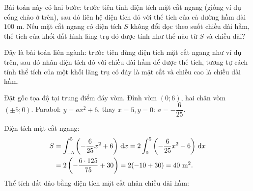 \begin{center}
\end{center}

\begin{hopgoiy}
Bài toán này có hai bước: trước tiên tính diện tích mặt cắt ngang (giống ví dụ cổng chào ở trên), sau đó liên hệ diện tích đó với thể tích của cả đường hầm dài $100$ m. Nếu mặt cắt ngang có diện tích $S$ không đổi dọc theo suốt chiều dài hầm, thể tích của khối đất hình lăng trụ đó được tính như thế nào từ $S$ và chiều dài?
\end{hopgoiy}

\begin{hopyduong}
Đây là bài toán liên ngành: trước tiên dùng diện tích mặt cắt ngang như ví dụ trên, sau đó nhân diện tích đó với chiều dài hầm để được thể tích, tương tự cách tính thể tích của một khối lăng trụ có đáy là mặt cắt và chiều cao là chiều dài hầm.
\end{hopyduong}

\begin{loigiai}
Đặt gốc tọa độ tại trung điểm đáy vòm. Đỉnh vòm $(0;6)$, hai chân vòm $(\pm5;0)$. Parabol: $y=ax^2+6$, thay $x=5,y=0$: $a=-\dfrac{6}{25}$.

Diện tích mặt cắt ngang:
\begin{align*}
S&=\int_{-5}^5\left(-\frac{6}{25}x^2+6\right)\,\mathrm{d}x = 2\int_0^5\left(-\frac{6}{25}x^2+6\right)\,\mathrm{d}x \\
 &= 2\left(-\frac{6\cdot125}{75}+30\right)=2(-10+30)=40 \text{ m}^2.
\end{align*}
Thể tích đất đào bằng diện tích mặt cắt nhân chiều dài hầm:
\end{loigiai}


